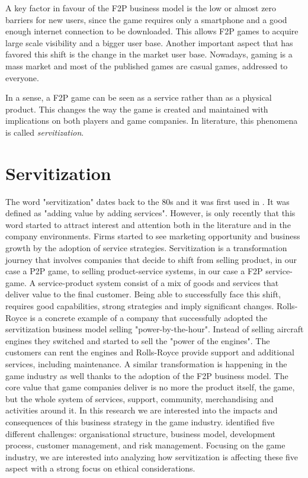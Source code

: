 A key factor in favour of the F2P business model is the low or almost zero barriers for new users, since the game requires only a smartphone and a good enough internet connection to be downloaded. This allows F2P games to acquire large scale visibility and a bigger user base. Another important aspect that has favored this shift is the change in the market user base. Nowadays, gaming is a mass market and most of the published games are casual games, addressed to everyone. 

In a sense, a F2P game can be seen as a service rather than as a physical product. This changes the way the game is created and maintained with implications on both players and game companies. In literature, this phenomena is called \textit{servitization}.

\section{Servitization}

The word "servitization" dates back to the 80s and it was first used in \cite{vandermerwe_servitization_1988}. It was defined as "adding value by adding services". However, is only recently that this word started to attract interest and attention both in the literature and in the company environments. Firms started to see marketing opportunity and business growth by the adoption of service strategies.
Servitization is a transformation journey that involves companies that decide to shift from selling product, in our case a P2P game, to selling product-service systems, in our case a F2P service-game. A service-product system consist of a mix of goods and services that deliver value to the final customer. Being able to successfully face this shift, requires good capabilities, strong strategies and imply significant changes.
Rolls-Royce is a concrete example of a company that successfully adopted the servitization business model selling "power-by-the-hour". Instead of selling aircraft engines they switched and started to sell the "power of the engines". The customers can rent the engines and Rolls-Royce provide support and additional services, including maintenance. 
A similar transformation is happening in the game industry as well thanks to the adoption of the F2P business model. The core value that game companies deliver is no more the product itself, the game, but the whole system of services, support, community, merchandising and activities around it.
In this research we are interested into the impacts and consequences of this business strategy in the game industry.
\textcite{zhang_challenges_2017} identified five different challenges: organisational structure, business model, development process, customer management, and risk management. 
Focusing on the game industry, we are interested into analyzing how servitization is affecting these five aspect with a strong focus on ethical considerations.




